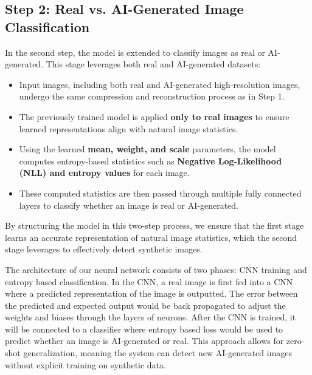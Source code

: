\documentclass{article} %
\begin{document}
\subsection{Step 2: Real vs. AI-Generated Image Classification}
In the second step, the model is extended to classify images as real or AI-generated. This stage leverages both real and AI-generated datasets:
\begin{itemize}
    \item Input images, including both real and AI-generated high-resolution images, undergo the same compression and reconstruction process as in Step 1.
    \item The previously trained model is applied \textbf{only to real images} to ensure learned representations align with natural image statistics.
    \item Using the learned \textbf{mean, weight, and scale} parameters, the model computes entropy-based statistics such as \textbf{Negative Log-Likelihood (NLL) and entropy values} for each image.
    \item These computed statistics are then passed through multiple fully connected layers to classify whether an image is real or AI-generated.
\end{itemize}

By structuring the model in this two-step process, we ensure that the first stage learns an accurate representation of natural image statistics, which the second stage leverages to effectively detect synthetic images.

The architecture of our neural network consists of two phases: CNN training and entropy based classification. In the CNN, a real image is first fed into a CNN where a predicted representation of the image is outputted. The error between the predicted and expected output would be back propagated to adjust the weights and biases through the layers of neurons. After the CNN is trained, it will be connected to a classifier where entropy based loss would be used to predict whether an image is AI-generated or real. This approach allows for zero-shot generalization, meaning the system can detect new AI-generated images without explicit training on synthetic data.

\end{document}
